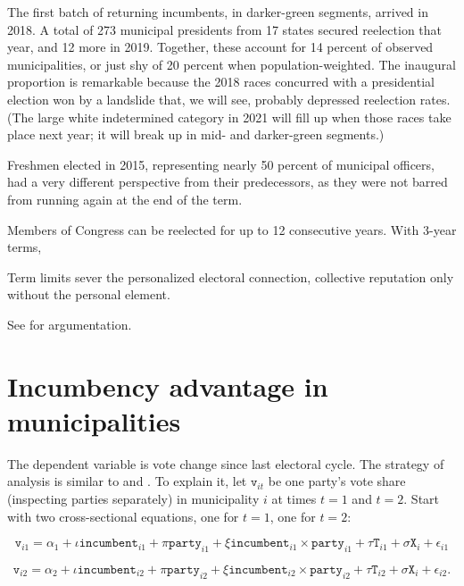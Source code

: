 \documentclass[letter,12pt]{article}
\newcommand{\vn}[1]{\vnform{#1}}      %
\newcommand{\vnform}[1]{\mathtt{#1}}  %
\begin{document}
The first batch of returning incumbents, in darker-green segments, arrived in 2018. A total of 273 municipal presidents from 17 states secured reelection that year, and 12 more in 2019. Together, these account for 14 percent of observed municipalities, or just shy of 20 percent when population-weighted. The inaugural proportion is remarkable because the 2018 races concurred with a presidential election won by a landslide that, we will see, probably depressed reelection rates. (The large white indetermined category in 2021 will fill up when those races take place next year; it will break up in mid- and darker-green segments.)

Freshmen elected in 2015, representing nearly 50 percent of municipal officers, had a very different perspective from their predecessors, as they were not barred from running again at the end of the term.  

Members of Congress can be reelected for up to 12 consecutive years. With 3-year terms, 

Term limits sever the personalized electoral connection, collective reputation only without the personal element.

See \citet{cain.etal.1987} for argumentation.

\section{Incumbency advantage in municipalities}

The dependent variable is vote change since last electoral cycle. The strategy of analysis is similar to \citet{levitt1994pacs} and \citet{cox.magar.1999}. To explain it, let $\vn{v}_{it}$ be one party's vote share (inspecting parties separately) in municipality $i$ at times $t=1$ and $t=2$. Start with two cross-sectional equations, one for $t=1$, one for $t=2$:

\begin{equation}
\vn{v}_{i1} = \alpha_1 + \iota \vn{incumbent}_{i1} + \pi \vn{party}_{i1} + \xi \vn{incumbent}_{i1} \times \vn{party}_{i1} + \tau \vn{T}_{i1} + \sigma \vn{X}_i + \epsilon_{i1}
\end{equation}

\begin{equation}
\vn{v}_{i2} = \alpha_2 + \iota \vn{incumbent}_{i2} + \pi \vn{party}_{i2} + \xi \vn{incumbent}_{i2} \times \vn{party}_{i2} + \tau \vn{T}_{i2} + \sigma \vn{X}_i + \epsilon_{i2}.
\end{equation}
\end{document}
